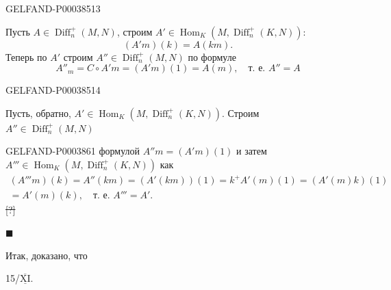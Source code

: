 \begin{GelfandAdjacentEvidence}{GELFAND-P000385}{13}

Пусть $A\in\operatorname{Diff}_n^+(M,N)$, строим
$A'\in\operatorname{Hom}_K(M,\operatorname{Diff}_n^+(K,N))$:
\begin{equation*}(A'm)(k)=A(km).\end{equation*}
Теперь по $A'$ строим $A''\in\operatorname{Diff}_n^+(M,N)$ по формуле
\begin{equation*}
A''_m=C\circ A'm=(A'm)(1)=A(m),\quad\text{т. е. }A''=A
\end{equation*}
\end{GelfandAdjacentEvidence}
\begin{GelfandAdjacentEvidence}{GELFAND-P000385}{14}

Пусть, обратно, $A'\in\operatorname{Hom}_K(M,\operatorname{Diff}_n^+(K,N))$.
Строим $A''\in\operatorname{Diff}_n^+(M,N)$
\end{GelfandAdjacentEvidence}



\begin{GelfandAdjacentEvidence}{GELFAND-P000386}{1}
формулой $A''m=(A'm)(1)$ и затем
$A'''\in\operatorname{Hom}_K(M,\operatorname{Diff}_n^+(K,N))$
как
\begin{multline*}
(A'''m)(k)=A''(km)=(A'(km))(1)=k^+A'(m)(1)=(A'(m)k)(1)\\
=A'(m)(k),\quad\text{т. е. }A'''=A'.
\end{multline*}
\sout{[?]}
\end{GelfandAdjacentEvidence}

$\blacksquare$

Итак, доказано, что 


15/$\overline{\underline{\mathrm{XI}}}$. 

